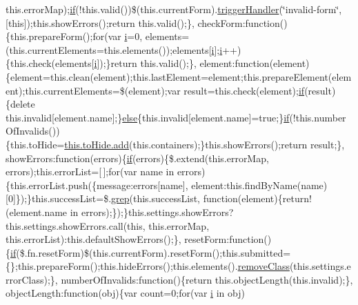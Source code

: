 \begin{DoxyCompactItemize}
this.\+error\+Map);\hyperlink{packages_2_respond_81_82_80_2content_2_scripts_2respond_8min_8js_a93851d60dd037a83509a1757b9ee7b66}{if}(!this.\+valid())\$(this.\+current\+Form).\hyperlink{jquery-1_810_82-vsdoc_8js_afe18935b86e978c91a4ae291ad8825c8}{trigger\+Handler}(\char`\"{}invalid-\/form\char`\"{}, \mbox{[}this\mbox{]});this.\+show\+Errors();return this.\+valid();\}, check\+Form\+:function()\{this.\+prepare\+Form();for(var \hyperlink{packages_2_respond_81_82_80_2content_2_scripts_2respond_8min_8js_a5e25b1d1bed9ab5f3174b76d6a722180}{i}=0, elements=(this.\+current\+Elements=this.\+elements());elements\mbox{[}\hyperlink{packages_2_respond_81_82_80_2content_2_scripts_2respond_8min_8js_a5e25b1d1bed9ab5f3174b76d6a722180}{i}\mbox{]};\hyperlink{packages_2_respond_81_82_80_2content_2_scripts_2respond_8min_8js_a5e25b1d1bed9ab5f3174b76d6a722180}{i}++)\{this.\+check(elements\mbox{[}\hyperlink{packages_2_respond_81_82_80_2content_2_scripts_2respond_8min_8js_a5e25b1d1bed9ab5f3174b76d6a722180}{i}\mbox{]});\}return this.\+valid();\}, element\+:function(element)\{element=this.\+clean(element);this.\+last\+Element=element;this.\+prepare\+Element(element);this.\+current\+Elements=\$(element);var result=this.\+check(element);\hyperlink{packages_2_respond_81_82_80_2content_2_scripts_2respond_8min_8js_a93851d60dd037a83509a1757b9ee7b66}{if}(result)\{delete this.\+invalid\mbox{[}element.\+name\mbox{]};\}\hyperlink{packages_2j_query_8_validation_81_811_81_2_content_2_scripts_2jquery_8validate_8js_a0544c3fe466e421738dae463968b70ba}{else}\{this.\+invalid\mbox{[}element.\+name\mbox{]}=true;\}\hyperlink{packages_2_respond_81_82_80_2content_2_scripts_2respond_8min_8js_a93851d60dd037a83509a1757b9ee7b66}{if}(!this.\+number\+Of\+Invalids())\{this.\+to\+Hide=\hyperlink{jquery-1_810_82-vsdoc_8js_a2f34e089948aad779d5a43c9b381caa6}{this.\+to\+Hide.\+add}(this.\+containers);\}this.\+show\+Errors();return result;\}, show\+Errors\+:function(errors)\{\hyperlink{packages_2_respond_81_82_80_2content_2_scripts_2respond_8min_8js_a93851d60dd037a83509a1757b9ee7b66}{if}(errors)\{\$.extend(this.\+error\+Map, errors);this.\+error\+List=\mbox{[}$\,$\mbox{]};for(var name in errors)\{this.\+error\+List.\+push(\{message\+:errors\mbox{[}name\mbox{]}, element\+:this.\+find\+By\+Name(name)\mbox{[}0\mbox{]}\});\}this.\+success\+List=\$.\hyperlink{jquery-1_810_82-vsdoc_8js_ae68047c53cf0b4906eb8f3256d860435}{grep}(this.\+success\+List, function(element)\{return!(element.\+name in errors);\});\}this.\+settings.\+show\+Errors?this.\+settings.\+show\+Errors.\+call(this, this.\+error\+Map, this.\+error\+List)\+:this.\+default\+Show\+Errors();\}, reset\+Form\+:function()\{\hyperlink{packages_2_respond_81_82_80_2content_2_scripts_2respond_8min_8js_a93851d60dd037a83509a1757b9ee7b66}{if}(\$.fn.\+reset\+Form)\$(this.\+current\+Form).reset\+Form();this.\+submitted=\{\};this.\+prepare\+Form();this.\+hide\+Errors();this.\+elements().\hyperlink{jquery-1_810_82-vsdoc_8js_a7cb7158f409485c170580c2afea3e234}{remove\+Class}(this.\+settings.\+error\+Class);\}, number\+Of\+Invalids\+:function()\{return this.\+object\+Length(this.\+invalid);\}, object\+Length\+:function(obj)\{var count=0;for(var \hyperlink{packages_2_respond_81_82_80_2content_2_scripts_2respond_8min_8js_a5e25b1d1bed9ab5f3174b76d6a722180}{i} in obj) 
\end{DoxyCompactItemize}
